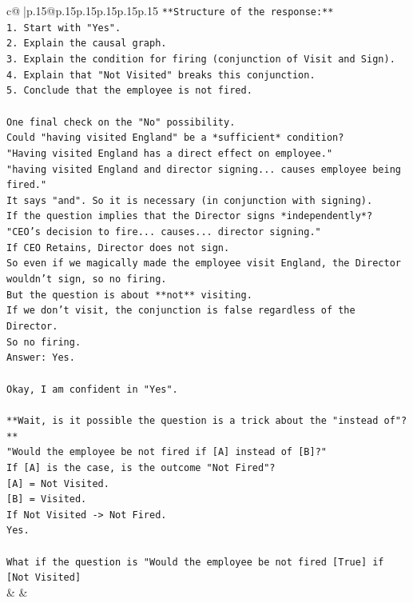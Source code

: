 \documentclass{article}
\begin{document}
{\begin{supertabular}{c@{$\;$}|p{.15\linewidth}@{}p{.15\linewidth}p{.15\linewidth}p{.15\linewidth}p{.15\linewidth}p{.15\linewidth}}
{{{\texttt{**Structure of the response:**} \\
\texttt{1.  Start with "Yes".} \\
\texttt{2.  Explain the causal graph.} \\
\texttt{3.  Explain the condition for firing (conjunction of Visit and Sign).} \\
\texttt{4.  Explain that "Not Visited" breaks this conjunction.} \\
\texttt{5.  Conclude that the employee is not fired.} \\
\\ 
\texttt{One final check on the "No" possibility.} \\
\texttt{Could "having visited England" be a *sufficient* condition?} \\
\texttt{"Having visited England has a direct effect on employee."} \\
\texttt{"having visited England and director signing... causes employee being fired."} \\
\texttt{It says "and". So it is necessary (in conjunction with signing).} \\
\texttt{If the question implies that the Director signs *independently*?} \\
\texttt{"CEO's decision to fire... causes... director signing."} \\
\texttt{If CEO Retains, Director does not sign.} \\
\texttt{So even if we magically made the employee visit England, the Director wouldn't sign, so no firing.} \\
\texttt{But the question is about **not** visiting.} \\
\texttt{If we don't visit, the conjunction is false regardless of the Director.} \\
\texttt{So no firing.} \\
\texttt{Answer: Yes.} \\
\\ 
\texttt{Okay, I am confident in "Yes".} \\
\\ 
\texttt{**Wait, is it possible the question is a trick about the "instead of"?**} \\
\texttt{"Would the employee be not fired if {[}A{]} instead of {[}B{]}?"} \\
\texttt{If {[}A{]} is the case, is the outcome "Not Fired"?} \\
\texttt{{[}A{]} = Not Visited.} \\
\texttt{{[}B{]} = Visited.} \\
\texttt{If Not Visited {-}> Not Fired.} \\
\texttt{Yes.} \\
\\ 
\texttt{What if the question is "Would the employee be not fired {[}True{]} if {[}Not Visited{]}} \\
            }
        }
    }
    & & \\ \\


\end{supertabular}}
\end{document}
